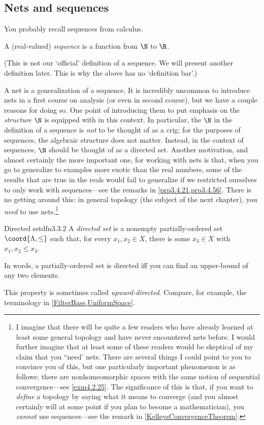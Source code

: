 \subsection{Nets and sequences}

You probably recall sequences from calculus.
\begin{textequation}
A (real-valued) \emph{sequence} is a function from $\N$ to $\R$.
\end{textequation}
(This is not our `official' definition of a sequence.  We will present another definition later.  This is why the above has no `definition bar'.)

A net is a generalization of a sequence.  It is incredibly uncommon to introduce nets in a first course on analysis (or even in second course), but we have a couple reasons for doing so.  One point of introducing them to put emphasis on the \emph{structure} $\N$ is equipped with in this context.  In particular, the $\N$ in the definition of a sequence is \emph{not} to be thought of as a crig; for the purposes of sequences, the algebraic structure does not matter.  Instead, in the context of sequences, $\N$ should be thought of as a directed set.  Another motivation, and almost certainly the more important one, for working with nets is that, when you go to generalize to examples more exotic than the real numbers, some of the results that are true in the reals would fail to generalize if we restricted ourselves to only work with sequences---see the remarks in \cref{prp3.4.21,prp3.4.56}.  There is no getting around this:  in general topology (the subject of the next chapter), you \emph{need} to use nets.\footnote{I imagine that there will be quite a few readers who have already learned at least some general topology and have never encountered nets before.  I would further imagine that at least some of these readers would be skeptical of my claim that you ``need' nets.  There are several things I could point to you to convince you of this, but one particularly important phenomenon is as follows:  there are nonhomeomorphic spaces with the same notion of sequential convergence---see \cref{exm4.2.25}.  The significance of this is that, if you want to \emph{define} a topology by saying what it means to converge (and you almost certainly will at some point if you plan to become a mathematician), you \emph{cannot} use sequences---see the remark in \cref{KelleysConvergenceTheorem}.}
\begin{dfn}{Directed set}{dfn3.3.2}
A \emph{directed set} is a nonempty partially-ordered set $\coord{\Lambda ,\leq}$ such that, for every $x_1,x_2\in X$, there is some $x_3\in X$ with $x_1,x_2\leq x_3$.
\begin{rmk}
In words, a partially-ordered set is directed iff you can find an upper-bound of any two elements.
\end{rmk}
\begin{rmk}
This property is sometimes called \emph{upward-directed}.  Compare, for example, the terminology in \cref{FilterBase,UniformSpace}.
\end{rmk}
\end{dfn}
